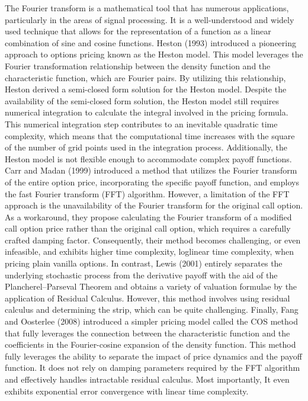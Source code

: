  The Fourier transform is a mathematical tool that has numerous applications, particularly in the areas of signal processing. It is a well-understood and widely used technique that allows for the representation of a function as a linear combination of sine and cosine functions. Heston (1993) introduced a pioneering approach to options pricing known as the Heston model. This model leverages the Fourier transformation relationship between the density function and the characteristic function, which are Fourier pairs. By utilizing this relationship, Heston derived a semi-closed form solution for the Heston model. Despite the availability of the semi-closed form solution, the Heston model still requires numerical integration to calculate the integral involved in the pricing formula. This numerical integration step contributes to an inevitable quadratic time complexity, which means that the computational time increases with the square of the number of grid points used in the integration process. Additionally, the Heston model is not flexible enough to accommodate complex payoff functions. Carr and Madan (1999) introduced a method that utilizes the Fourier transform of the entire option price, incorporating the specific payoff function, and employs the fast Fourier transform (FFT) algorithm. However, a limitation of the FFT approach is the unavailability of the Fourier transform for the original call option. As a workaround, they propose calculating the Fourier transform of a modified call option price rather than the original call option, which requires a carefully crafted damping factor. Consequently, their method becomes challenging, or even infeasible, and exhibits higher time complexity, loglinear time complexity, when pricing plain vanilla options. In contrast, Lewis (2001) entirely separates the underlying stochastic process from the derivative payoff with the aid of the Plancherel–Parseval Theorem and obtains a variety of valuation formulae by the application of Residual Calculus. However, this method involves using residual calculus and determining the strip, which can be quite challenging. Finally, Fang and Oosterlee (2008) introduced a simpler pricing model called the COS method that fully leverages the connection between the characteristic function and the coefficients in the Fourier-cosine expansion of the density function. This method fully leverages the ability to separate the impact of price dynamics and the payoff function. It does not rely on damping parameters required by the FFT algorithm and effectively handles intractable residual calculus. Most importantly, It even exhibits exponential error convergence with linear time complexity.\\
 
